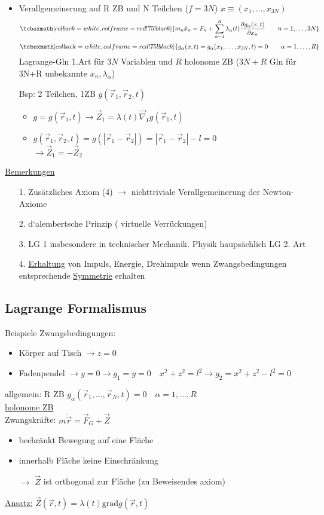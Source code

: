 \documentclass[titlepage,12pt,a4paper,ngerman]{report}
\newcommand{\tx}[1]{\textrm{#1}}
\newcommand{\grad}{\tx{grad}}
\newcommand{\rmbox}[1]{\tcboxmath[colback=white,colframe=red!75!black]{#1}} %
\renewcommand{\boxed}{\rmbox}
\begin{document}
{\begin{itemize}
	\item Verallgemeinerung auf R ZB und N Teilchen ($ f=3N $) $ x \equiv(x_1,\dots,x_{3N}) $
	$$\boxed{m_n \ddot{x}_n = F_n + \sum_{\alpha = 1}^{R} \lambda_\alpha(t) \frac{\partial g_\alpha(x,t)}{\partial x_n} \qquad n = 1,\dots , 3N}$$
	$$\boxed{g_\alpha (x,t) = g_\alpha (x_1,\dots , x_{3N},t) = 0 \qquad \alpha = 1, \dots , R}$$
	Lagrange-Gln 1.Art für $3N$ Variablen und $R$ holonome ZB ($3N+R$ Gln für 3N+R unbekannte $ x_n, \lambda_\alpha $)
	\item[Bsp:] 2 Teilchen, 1ZB $ g(\vec{r}_1,\vec{r}_2,t) $\\
	\begin{itemize}
		\item $ g = g(\vec{r}_1,t) \rightarrow \vec{Z}_1 = \lambda(t) \vec{\nabla}_1 g(\vec{r}_1,t) $
		\item $ g(\vec{r}_1,\vec{r}_2,t) = g(|\vec{r}_1 - \vec{r}_2|) = |\vec{r}_1 - \vec{r}_2| -l = 0 $\\
		$ \rightarrow \vec{Z}_1 = - \vec{Z}_2 $
	\end{itemize}
\end{itemize}
\underline{Bemerkungen}\\
\begin{itemize}
	\item[1.] Zusätzliches Axiom (4) $ \rightarrow $ nichttriviale Verallgemeinerung der Newton-Axiome
	\item[2.] d`alembertsche Prinzip ( virtuelle Verrückungen)
	\item[3.] LG 1 insbesondere in technischer Mechanik. Physik haupsächlich LG 2. Art
	\item[4.] \underline{Erhaltung} von Impuls, Energie, Drehimpuls wenn Zwangsbedingungen entsprechende \underline{Symmetrie} erhalten
\end{itemize}

\subsection*{Lagrange Formalismus }
Beispiele Zwangsbedingungen:
\begin{itemize}
	\item Körper auf Tisch $ \rightarrow z = 0 $
	\item Fadenpendel $ \rightarrow y = 0 \rightarrow g_1 = y = 0 \quad x^2 + z^2 = l^2 \rightarrow g_2 = x^2 + z^2 - l^2 = 0 $
\end{itemize}
allgemein: R ZB $ g_\alpha ( \vec{r}_1, \dots , \vec{r}_N,t) = 0 \quad \alpha = 1,\dots,R $ \\
\underline{ holonome ZB }\\
Zwangskräfte: $ m\ddot{\vec{r}} = \vec{F}_G + \vec{Z} $\\
\begin{itemize}
	\item bechränkt Bewegung auf eine Fläche
	\item innerhalb Fläche keine Einschränkung
	\item[$ \rightarrow $] $ \vec{Z} $ ist orthogonal zur Fläche (zu Beweisendes axiom)
\end{itemize}
\underline{Ansatz:} $ \vec{Z}(\vec{r},t) = \lambda(t) \grad g(\vec{r},t) $

}
\end{document}
